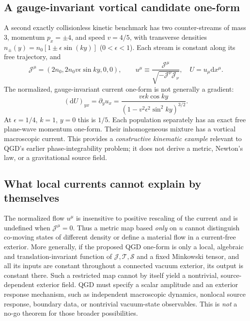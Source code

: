 \documentclass[11pt,a4paper]{article}
\newcommand{\dd}{\mathrm d}
\newcommand{\TT}{\mathcal T}
\newcommand{\JJ}{\mathcal J}
\newcommand{\Spin}{\mathcal S}
\begin{document}
\subsection{A gauge-invariant vortical candidate one-form}
A second exactly collisionless kinetic benchmark has two counter-streams of mass $3$, momentum $p_x=\pm4$, and speed $v=4/5$, with transverse densities $n_\pm(y)=n_0[1\pm\epsilon\sin(ky)]$ ($0<\epsilon<1$). Each stream is constant along its free trajectory, and
\begin{equation}\label{eq:qgd006-beam}
\JJ^\mu=(2n_0,2n_0v\epsilon\sin ky,0,0),\qquad
u^\mu\equiv\frac{\JJ^\mu}{\sqrt{-\JJ^\nu\JJ_\nu}},\quad U=u_\mu\dd x^\mu.
\end{equation}
The normalized, gauge-invariant current one-form is not generally a gradient:
\begin{equation}\label{eq:qgd006-vorticity}
\boxed{(\dd U)_{yx}=\partial_yu_x=
\frac{v\epsilon k\cos ky}{(1-v^2\epsilon^2\sin^2 ky)^{3/2}}.}
\end{equation}
At $\epsilon=1/4$, $k=1$, $y=0$ this is $1/5$. Each population separately has an exact free plane-wave momentum one-form. Their inhomogeneous mixture has a vortical macroscopic current. This provides a \emph{constructive kinematic example} relevant to QGD's earlier phase-integrability problem; it does not derive a metric, Newton's law, or a gravitational source field.

\subsection{What local currents cannot explain by themselves}\label{sec:qgd006-exterior}
The normalized flow $u^\mu$ is insensitive to positive rescaling of the current and is undefined when $\JJ^\mu=0$. Thus a metric map based \emph{only} on $u$ cannot distinguish co-moving states of different density or define a material flow in a current-free exterior. More generally, if the proposed QGD one-form is only a local, algebraic and translation-invariant function of $\JJ,\TT,\Spin$ and a fixed Minkowski tensor, and all its inputs are constant throughout a connected vacuum exterior, its output is constant there. Such a restricted map cannot by itself yield a nontrivial, source-dependent exterior field. QGD must specify a scalar amplitude and an exterior response mechanism, such as independent macroscopic dynamics, nonlocal source response, boundary data, or nontrivial vacuum-state observables. This is \emph{not} a no-go theorem for those broader possibilities.
\end{document}
